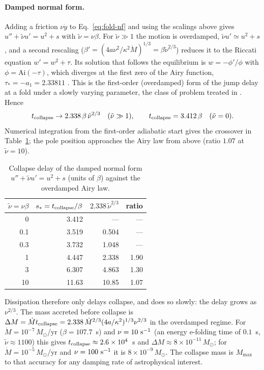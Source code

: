 \documentclass[11pt]{article}
\begin{document}
\paragraph{Damped normal form.} Adding a friction $\nu\dot y$ to Eq.~\eqref{eq:fold-nf} and using the scalings above gives $u''+\tilde\nu u'=u^2+s$ with $\tilde\nu=\nu\beta$. For $\tilde\nu\gg1$ the motion is overdamped, $\tilde\nu u'\simeq u^2+s$, and a second rescaling ($\beta'=(4a\nu^2/\kappa^2\dot M)^{1/3}=\beta\tilde\nu^{2/3}$) reduces it to the Riccati equation $w'=w^2+\tau$. Its solution that follows the equilibrium is $w=-\phi'/\phi$ with $\phi=\mathrm{Ai}(-\tau)$, which diverges at the first zero of the Airy function, $\tau_*=-a_1=2.33811$ \citep[][\S9.9]{DLMF}. This is the first-order (overdamped) form of the jump delay at a fold under a slowly varying parameter, the class of problem treated in \citet{Haberman1979}. Hence
\begin{equation}
t_{\rm collapse}\to 2.338\,\beta\,\tilde\nu^{2/3}\quad(\tilde\nu\gg1),\qquad t_{\rm collapse}=3.412\,\beta\quad(\tilde\nu=0).
\end{equation}
Numerical integration from the first-order adiabatic start gives the crossover in Table~\ref{tab:damped}; the pole position approaches the Airy law from above (ratio $1.07$ at $\tilde\nu=10$).
\begin{table}[ht]
\centering\footnotesize
\begin{tabular}{rrrr}
\hline
$\tilde\nu=\nu\beta$ & $s_*=t_{\rm collapse}/\beta$ & $2.338\,\tilde\nu^{2/3}$ & ratio\\
\hline
0 & 3.412 & --- & ---\\
0.1 & 3.519 & 0.504 & ---\\
0.3 & 3.732 & 1.048 & ---\\
1 & 4.447 & 2.338 & 1.90\\
3 & 6.307 & 4.863 & 1.30\\
10 & 11.63 & 10.85 & 1.07\\
\hline
\end{tabular}
\caption{Collapse delay of the damped normal form $u''+\tilde\nu u'=u^2+s$ (units of $\beta$) against the overdamped Airy law.}
\label{tab:damped}
\end{table}
Dissipation therefore only delays collapse, and does so slowly: the delay grows as $\nu^{2/3}$. The mass accreted before collapse is $\Delta M=\dot M t_{\rm collapse}=2.338\,\dot M^{2/3}(4a/\kappa^2)^{1/3}\nu^{2/3}$ in the overdamped regime. For $\dot M=10^{-7}\,M_\odot$/yr ($\beta=107.7$~s) and $\nu=10\ {\rm s^{-1}}$ (an energy e-folding time of $0.1$~s, $\tilde\nu\approx1100$) this gives $t_{\rm collapse}\approx2.6\times10^4$~s and $\Delta M\approx8\times10^{-11}\,M_\odot$; for $\dot M=10^{-5}\,M_\odot$/yr and $\nu=100\ {\rm s^{-1}}$ it is $8\times10^{-9}\,M_\odot$. The collapse mass is $M_{\max}$ to that accuracy for any damping rate of astrophysical interest.
\end{document}
